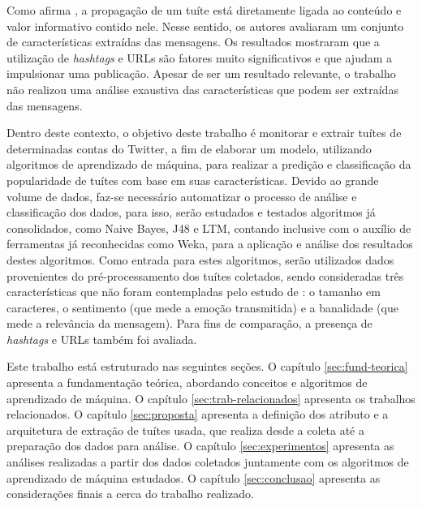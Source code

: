 \documentclass[oneside,openright,12pt]{ufsm_2015} %
\begin{document}
{\par Como afirma \cite{ieee:suh:10}, a propagação de um tuíte está diretamente ligada ao conteúdo e valor informativo contido nele. Nesse sentido, os autores avaliaram um conjunto de características extraídas das mensagens. Os resultados mostraram que a utilização de \textit{hashtags} e URLs são fatores muito significativos e que ajudam a impulsionar uma publicação. Apesar de ser um resultado relevante, o trabalho não realizou uma análise exaustiva das características que podem ser extraídas das mensagens.

\par Dentro deste contexto, o objetivo deste trabalho é monitorar e extrair tuítes de determinadas contas do Twitter, a fim de elaborar um modelo, utilizando algoritmos de aprendizado de máquina, para realizar a predição e classificação da popularidade de tuítes com base em suas características. Devido ao grande volume de dados, faz-se necessário automatizar o processo de análise e classificação dos dados, para isso, serão estudados e testados algoritmos já consolidados, como Naive Bayes, J48 e LTM, contando inclusive com o auxílio de ferramentas já reconhecidas como Weka, para a aplicação e análise dos resultados destes algoritmos. Como entrada para estes algoritmos, serão utilizados dados provenientes do pré-processamento dos tuítes coletados, sendo consideradas três características que não foram contempladas pelo estudo de \cite{ieee:suh:10}: o tamanho em caracteres, o sentimento (que mede a emoção transmitida) e a banalidade (que mede a relevância da mensagem). Para fins de comparação, a presença de \textit{hashtags} e URLs também foi avaliada.

\par Este trabalho está estruturado nas seguintes seções. O capítulo \ref{sec:fund-teorica} apresenta a fundamentação teórica, abordando conceitos e algoritmos de aprendizado de máquina. O capítulo \ref{sec:trab-relacionados} apresenta os trabalhos relacionados. O capítulo \ref{sec:proposta} apresenta a definição dos atributo e a arquitetura de extração de tuítes usada, que realiza desde a coleta até a preparação dos dados para análise. O capítulo \ref{sec:experimentos} apresenta as análises realizadas a partir dos dados coletados juntamente com os algoritmos de aprendizado de máquina estudados. O capítulo \ref{sec:conclusao} apresenta as considerações finais a cerca do trabalho realizado.

}
\geraintro  %
\end{document}
